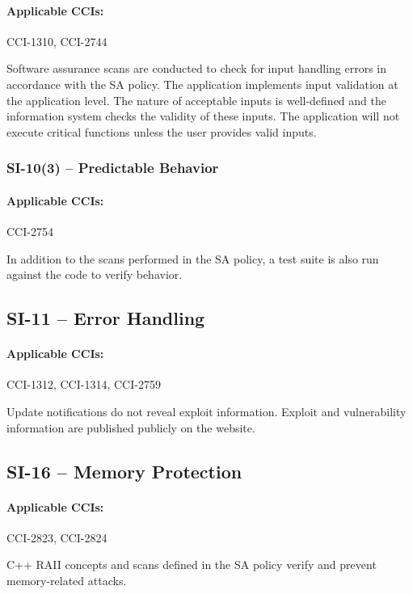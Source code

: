 \documentclass[letterpaper, 10pt, twoside]{article}
\begin{document}
\paragraph{Applicable CCIs:} CCI-1310, CCI-2744

Software assurance scans are conducted to check for input handling errors in accordance with the SA policy. The application implements input validation at the application level. The nature of acceptable inputs is well-defined and the information system checks the validity of these inputs. The application will not execute critical functions unless the user provides valid inputs.

\subsubsection{SI-10(3) -- Predictable Behavior}

\paragraph{Applicable CCIs:} CCI-2754

In addition to the scans performed in the SA policy, a test suite is also run against the code to verify behavior.

\subsection{SI-11 -- Error Handling}

\paragraph{Applicable CCIs:} CCI-1312, CCI-1314, CCI-2759

Update notifications do not reveal exploit information. Exploit and vulnerability information are published publicly on the website.

\subsection{SI-16 -- Memory Protection}

\paragraph{Applicable CCIs:} CCI-2823, CCI-2824

C++ RAII concepts and scans defined in the SA policy verify and prevent memory-related attacks.

\clearpage
\printbibliography
\end{document}
